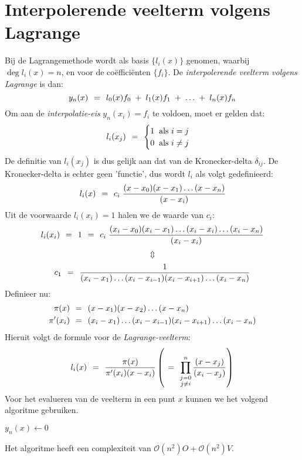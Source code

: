 \documentclass[11pt]{report}
\def \eq {\hspace{1.5mm}=\hspace{1.5mm}}
\def \h {\hspace{2mm}}
\def \hm {\hspace{1mm}}
\def \plus {\hspace{1mm}+\hspace{1mm}}
\def \updown {$$\Updownarrow$$}
\begin{document}
\section{Interpolerende veelterm volgens Lagrange}
	Bij de Lagrangemethode wordt als basis $\{l_i(x)\}$ genomen, waarbij $\deg l_i(x) = n$, en voor de co\"{e}ffici\"{e}nten $\{f_i\}$. De \textit{interpolerende veelterm volgens Lagrange} is dan:
	\begin{equation}
		y_n(x) \eq l_0(x)f_0 \plus l_1(x)f_1 \plus \dots \plus l_n(x)f_n
	\end{equation}
	Om aan de \textit{interpolatie-eis} $y_n(x_i) = f_i$ te voldoen, moet er gelden dat:
	\begin{equation*}
		l_i(x_j) \eq 
		\begin{cases}
			1 \h\text{als } i = j \\
			0 \h\text{als } i \neq j 
		\end{cases}
	\end{equation*}
	De definitie van $l_i(x_j)$ is dus gelijk aan dat van de Kronecker-delta $\delta_{ij}$. De Kronecker-delta is echter geen 'functie', dus wordt $l_i$ als volgt gedefinieerd:
	\begin{equation*}
		l_i(x) \eq c_i \hm\frac{(x-x_0)(x-x_1)\dots(x-x_n)}{(x-x_i)}
	\end{equation*}
	Uit de voorwaarde $l_i(x_i) = 1$ halen we de waarde van $c_i$:
	$$l_i(x_i) \eq 1 \eq c_i\hm \frac{(x_i-x_0)(x_i-x_1)\dots(x_i - x_i)\dots(x_i-x_n)}{(x_i-x_i)}$$
	\updown
	$$c_1 \eq \frac{1}{(x_i-x_1)\dots(x_i-x_{i-1})(x_i - x_{i+1})\dots (x_i-x_n)}$$
	Definieer nu:
	\begin{align*}
		\pi(x) &\eq (x - x_1)(x - x_2) \dots (x - x_n)\\
		\pi'(x_i) & \eq (x_i - x_1)\dots(x_i - x_{i-1})(x_i - x_{i+1})\dots (x_i - x_n)
	\end{align*}
	Hieruit volgt de formule voor de \textit{Lagrange-veelterm}:
	\begin{equation}
		l_i(x) \eq \frac{\pi(x)}{\pi'(x_i)(x-x_i)} \left(\eq \prod^n_{\substack{j = 0\\ j \neq i}} \frac{(x - x_j)}{(x_i - x_j)} \right)
	\end{equation}
	Voor het evalueren van de veelterm in een punt $x$ kunnen we het volgend algoritme gebruiken.
	\begin{center}
	\begin{algorithm}[H]
		\SetAlgoLined
		$y_n(x) \leftarrow 0$ \;
	\end{algorithm}
	\end{center}
	Het algoritme heeft een complexiteit van $\mathcal{O}(n^2)O + \mathcal{O}(n^2)V$.
\end{document}
